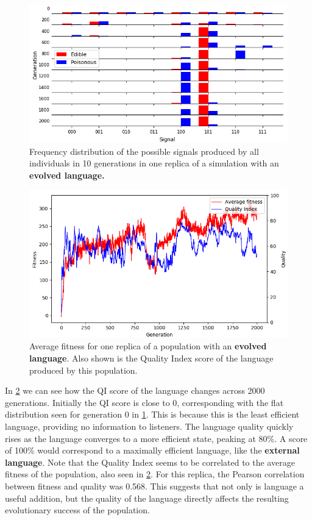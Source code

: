 \documentclass[12pt,a4paper]{report}
\begin{document}
\begin{figure}[t]
  \centering
  \captionsetup{width=.9\linewidth}
  \includegraphics[width=.8\linewidth]{results/language.png}
    \caption{Frequency distribution of the possible signals produced by all individuals in 10 generations in one replica of a simulation with an \bf{evolved language}.}
   \label{fig:language-evolved3}
\end{figure}

\begin{figure}[t]
  \centering
  \captionsetup{width=.9\linewidth}
  \includegraphics[width=.8\linewidth]{results/correlation.png}
 \caption{Average fitness for one replica of a population with an {\bf evolved language}. Also shown is the Quality Index score of the language produced by this population.}
  \label{fig:correlation}
\end{figure}

In \cref{fig:correlation} we can see how the QI score of the language changes across 2000 generations. Initially the QI score is close to 0, corresponding with the flat distribution seen for generation 0 in \cref{fig:language-evolved3}. This is because this is the least efficient language, providing no information to listeners. The language quality quickly rises as the language converges to a more efficient state, peaking at 80\%. A score of 100\% would correspond to a maximally efficient language, like the {\bf external language}. Note that the Quality Index seems to be correlated to the average fitness of the population, also seen in \cref{fig:correlation}. For this replica, the Pearson correlation between fitness and quality was 0.568. This suggests that not only is language a useful addition, but the quality of the language directly affects the resulting evolutionary success of the population.
\end{document}
